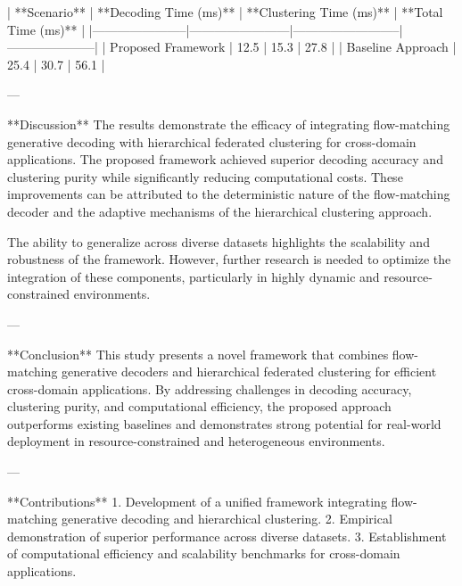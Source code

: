 | **Scenario**         | **Decoding Time (ms)** | **Clustering Time (ms)** | **Total Time (ms)** |
|-----------------------|------------------------|--------------------------|---------------------|
| Proposed Framework   | 12.5                  | 15.3                     | 27.8                |
| Baseline Approach    | 25.4                  | 30.7                     | 56.1                |

---

**Discussion**  
The results demonstrate the efficacy of integrating flow-matching generative decoding with hierarchical federated clustering for cross-domain applications. The proposed framework achieved superior decoding accuracy and clustering purity while significantly reducing computational costs. These improvements can be attributed to the deterministic nature of the flow-matching decoder and the adaptive mechanisms of the hierarchical clustering approach.

The ability to generalize across diverse datasets highlights the scalability and robustness of the framework. However, further research is needed to optimize the integration of these components, particularly in highly dynamic and resource-constrained environments.

---

**Conclusion**  
This study presents a novel framework that combines flow-matching generative decoders and hierarchical federated clustering for efficient cross-domain applications. By addressing challenges in decoding accuracy, clustering purity, and computational efficiency, the proposed approach outperforms existing baselines and demonstrates strong potential for real-world deployment in resource-constrained and heterogeneous environments.

---

**Contributions**  
1. Development of a unified framework integrating flow-matching generative decoding and hierarchical clustering.
2. Empirical demonstration of superior performance across diverse datasets.
3. Establishment of computational efficiency and scalability benchmarks for cross-domain applications.